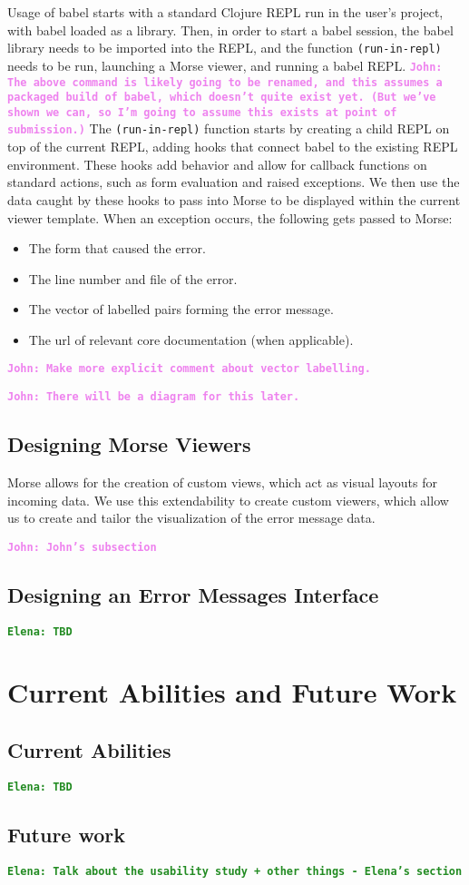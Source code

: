 \documentclass[12pt]{article}
\newcommand{\comment}[1]{{\bf \tt  {#1}}}
\newcommand{\emcomment}[1]{\textcolor{ForestGreen}{\comment{Elena: {#1}}}}
\newcommand{\jwcomment}[1]{\textcolor{violet}{\comment{John: {#1}}}}
\begin{document}
Usage of babel starts with a standard Clojure REPL run in the user's project, with babel loaded as a library.
Then, in order to start a babel session, the babel library needs to be imported into the REPL, and the function 
\texttt{(run-in-repl)} needs to be run, launching a Morse viewer, and running a babel REPL.
\jwcomment{The above command is likely going to be renamed, and this assumes a packaged build of babel, which
doesn't quite exist yet. (But we've shown we can, so I'm going to assume this exists at point of submission.)}
The \texttt{(run-in-repl)} function starts by creating a child REPL on top of the current REPL, adding hooks that connect babel to 
the existing REPL environment. 
These hooks add behavior and allow for callback functions on standard actions, such as form evaluation and raised exceptions.
We then use the data caught by these hooks to pass into Morse to be displayed within the current viewer template. 
When an exception occurs, the following gets passed to Morse:
\begin{itemize}
	\item{The form that caused the error.}
	\item{The line number and file of the error.}
	\item{The vector of labelled pairs forming the error message.}
	\item{The url of relevant core documentation (when applicable).}
\end{itemize}

\jwcomment{Make more explicit comment about vector labelling.}

\jwcomment{There will be a diagram for this later.}

\subsection{Designing Morse Viewers}\label{subsec:Morse-Viewers}
Morse allows for the creation of custom views, which act as visual layouts for incoming data. 
We use this extendability to create custom viewers, which allow us to create and tailor the visualization of the error message data.


\jwcomment{John's subsection}

\subsection{Designing an Error Messages Interface}\label{subsec:interface}
\emcomment{TBD}

		
\section{Current Abilities and Future Work}\label{sec:conclusion}
	\subsection{Current Abilities}\label{subsec:current-abilities}
	\emcomment{TBD}
	

	\subsection{Future work}\label{subsec:future}
	\emcomment{Talk about the usability study + other things - Elena's section}



\end{document}

